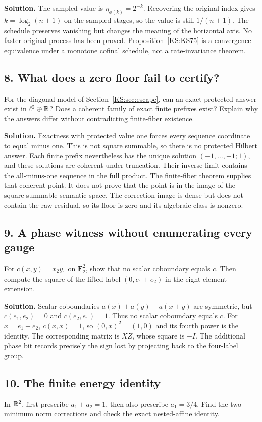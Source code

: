 \documentclass[11pt,oneside,openany]{book}
\numberwithin{equation}{section}
\begin{document}
\textbf{Solution.} The sampled value is $\eta_{\phi(k)}=2^{-k}$. Recovering the original index gives $k=\log_2(n+1)$ on the sampled stages, so the value is still $1/(n+1)$. The schedule preserves vanishing but changes the meaning of the horizontal axis. No faster original process has been proved. Proposition~\ref{KS:KS75} is a convergence equivalence under a monotone cofinal schedule, not a rate-invariance theorem.

\subsection*{8. What does a zero floor fail to certify?}
For the diagonal model of Section~\ref{KS:sec:escape}, can an exact protected answer exist in $\ell^2\oplus\mathbb R$? Does a coherent family of exact finite prefixes exist? Explain why the answers differ without contradicting finite-fiber existence.

\textbf{Solution.} Exactness with protected value one forces every sequence coordinate to equal minus one. This is not square summable, so there is no protected Hilbert answer. Each finite prefix nevertheless has the unique solution $(-1,\ldots,-1;1)$, and these solutions are coherent under truncation. Their inverse limit contains the all-minus-one sequence in the full product. The finite-fiber theorem supplies that coherent point. It does not prove that the point is in the image of the square-summable semantic space. The correction image is dense but does not contain the raw residual, so its floor is zero and its algebraic class is nonzero.

\subsection*{9. A phase witness without enumerating every gauge}
For $c(x,y)=x_2y_1$ on $\mathbf F_2^2$, show that no scalar coboundary equals $c$. Then compute the square of the lifted label $(0,e_1+e_2)$ in the eight-element extension.

\textbf{Solution.} Scalar coboundaries $a(x)+a(y)-a(x+y)$ are symmetric, but $c(e_1,e_2)=0$ and $c(e_2,e_1)=1$. Thus no scalar coboundary equals $c$. For $x=e_1+e_2$, $c(x,x)=1$, so $(0,x)^2=(1,0)$ and its fourth power is the identity. The corresponding matrix is $XZ$, whose square is $-I$. The additional phase bit records precisely the sign lost by projecting back to the four-label group.

\subsection*{10. The finite energy identity}
In $\mathbb R^2$, first prescribe $a_1+a_2=1$, then also prescribe $a_1=3/4$. Find the two minimum norm corrections and check the exact nested-affine identity.
\end{document}
